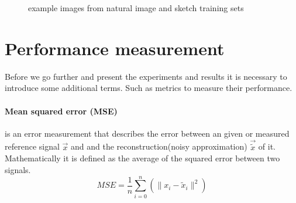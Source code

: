 \begin{figure}[h]
\hspace{5mm}
\hspace{5mm}
\hspace{5mm}
\hspace{5mm}
\caption{example images from natural image and sketch training sets}
\label{fig:database_images}
\end{figure}

\section{Performance measurement}
Before we go further and present the experiments and results it is necessary to
introduce some additional terms. Such as metrics to measure their performance.

\paragraph{Mean squared error (MSE)} is an error measurement that
describes the error between an given or measured reference signal $\vec{x}$
and and the reconstruction(noisy approximation) $\vec{\tilde{x}}$ of it.
Mathematically it is defined as the average of the squared error between two
signals.
\begin{equation*}
 MSE = \frac{1}{n} \sum_{i=0}^{n} \left( {\lVert x_i -
\tilde{x}_i\rVert^{2}}\right)
\end{equation*}

